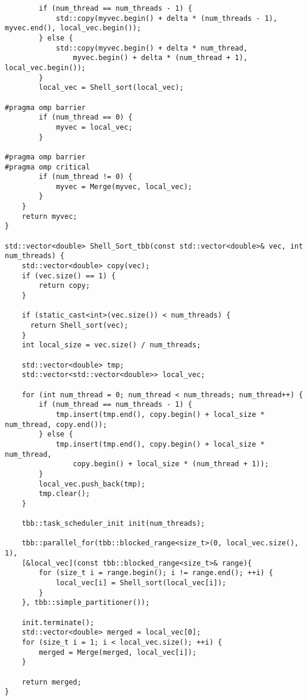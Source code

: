 \documentclass{report}
\begin{document}
\begin{lstlisting}
        if (num_thread == num_threads - 1) {
            std::copy(myvec.begin() + delta * (num_threads - 1), myvec.end(), local_vec.begin());
        } else {
            std::copy(myvec.begin() + delta * num_thread,
                myvec.begin() + delta * (num_thread + 1), local_vec.begin());
        }
        local_vec = Shell_sort(local_vec);

#pragma omp barrier
        if (num_thread == 0) {
            myvec = local_vec;
        }

#pragma omp barrier
#pragma omp critical
        if (num_thread != 0) {
            myvec = Merge(myvec, local_vec);
        }
    }
    return myvec;
}

std::vector<double> Shell_Sort_tbb(const std::vector<double>& vec, int num_threads) {
    std::vector<double> copy(vec);
    if (vec.size() == 1) {
        return copy;
    }

    if (static_cast<int>(vec.size()) < num_threads) {
      return Shell_sort(vec);
    }
    int local_size = vec.size() / num_threads;

    std::vector<double> tmp;
    std::vector<std::vector<double>> local_vec;

    for (int num_thread = 0; num_thread < num_threads; num_thread++) {
        if (num_thread == num_threads - 1) {
            tmp.insert(tmp.end(), copy.begin() + local_size * num_thread, copy.end());
        } else {
            tmp.insert(tmp.end(), copy.begin() + local_size * num_thread,
                copy.begin() + local_size * (num_thread + 1));
        }
        local_vec.push_back(tmp);
        tmp.clear();
    }

    tbb::task_scheduler_init init(num_threads);

    tbb::parallel_for(tbb::blocked_range<size_t>(0, local_vec.size(), 1),
    [&local_vec](const tbb::blocked_range<size_t>& range){
        for (size_t i = range.begin(); i != range.end(); ++i) {
            local_vec[i] = Shell_sort(local_vec[i]);
        }
    }, tbb::simple_partitioner());

    init.terminate();
    std::vector<double> merged = local_vec[0];
    for (size_t i = 1; i < local_vec.size(); ++i) {
        merged = Merge(merged, local_vec[i]);
    }

    return merged;
}


\end{lstlisting}
\end{document}
